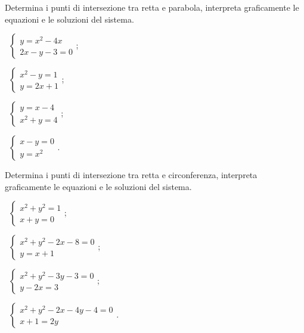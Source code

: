 \begin{esercizio}[\Ast]
 \label{ese:6.46}
Determina i punti di intersezione tra retta e parabola, interpreta graficamente le equazioni e le soluzioni del sistema.
\begin{multicols}{2}
 \begin{enumeratea}
 \item~$\left\{\begin{array}{l}y=x^2-4x\\2x-y-3=0 \end{array}\right.$;
 \item~$\left\{\begin{array}{l}x^2-y=1\\y=2x+1 \end{array}\right.$;
 \item~$\left\{\begin{array}{l}y=x-4\\x^{2}+y=4 \end{array}\right.$;
 \item~$\left\{\begin{array}{l}x-y=0\\y=x^{2}\end{array}\right.$.
 \end{enumeratea}
 \end{multicols}
\end{esercizio}

\begin{esercizio}[\Ast]
 \label{ese:6.47}
Determina i punti di intersezione tra retta e circonferenza, interpreta graficamente le equazioni e le soluzioni del sistema.
\begin{multicols}{2}
 \begin{enumeratea}
 \item~$\left\{\begin{array}{l}x^2+y^2=1\\x+y=0 \end{array}\right.$;
 \item~$\left\{\begin{array}{l}x^2+y^2-2x-8=0\\y=x+1 \end{array}\right.$;
 \item~$\left\{\begin{array}{l}x^2+y^2-3y-3=0\\y-2x=3 \end{array}\right.$;
 \item~$\left\{\begin{array}{l}x^2+y^2-2x-4y-4=0\\x+1=2y\end{array}\right.$.
 \end{enumeratea}
 \end{multicols}
\end{esercizio}
\pagebreak
